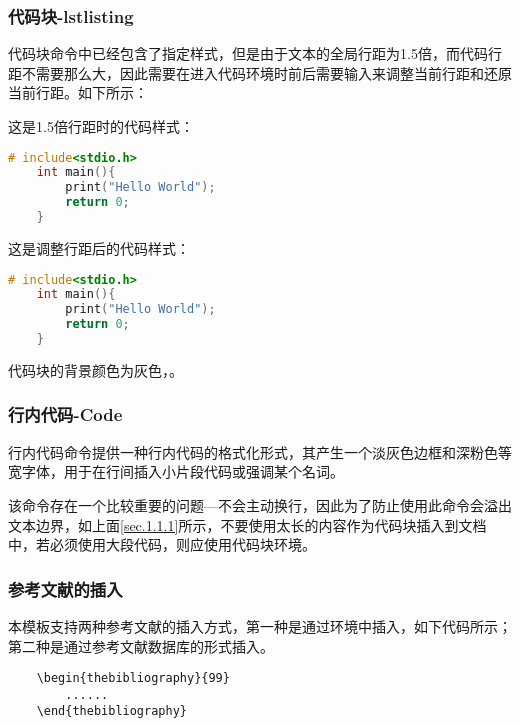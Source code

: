 \documentclass{nitthesis}
\begin{document}
\subsubsection{代码块-lstlisting}

代码块命令中已经包含了指定样式，但是由于文本的全局行距为1.5倍，而代码行距不需要那么大，因此需要在进入代码环境时前后需要输入来调整当前行距和还原当前行距。如下所示：

这是1.5倍行距时的代码样式：

\begin{lstlisting}[language=C]
    # include<stdio.h>
    int main(){
        print("Hello World");
        return 0;
    }
\end{lstlisting}

这是调整行距后的代码样式：

\linespread{1}
\begin{lstlisting}[language=C]
    # include<stdio.h>
    int main(){
        print("Hello World");
        return 0;
    }
\end{lstlisting}
\linespread{1.5}

代码块的背景颜色为灰色，。

\subsubsection{行内代码-Code}

行内代码命令提供一种行内代码的格式化形式，其产生一个淡灰色边框和深粉色等宽字体，用于在行间插入小片段代码或强调某个名词。

该命令存在一个比较重要的问题---不会主动换行，因此为了防止使用此命令会溢出文本边界，如上面\ref{sec.1.1.1}所示，不要使用太长的内容作为代码块插入到文档中，若必须使用大段代码，则应使用代码块环境。

\subsubsection{参考文献的插入}

本模板支持两种参考文献的插入方式，第一种是通过环境中插入，如下代码所示；第二种是通过参考文献数据库的形式插入。

\begin{lstlisting}
    \begin{thebibliography}{99}
        ......
    \end{thebibliography}
\end{lstlisting}
\end{document}

